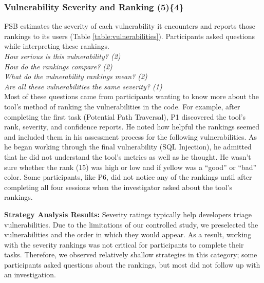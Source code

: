 \documentclass[10pt,journal,compsoc]{IEEEtran}
\begin{document}



\subsubsection{Vulnerability Severity and Ranking (5)\{4\}}

\label{bsr}

FSB estimates the severity of each vulnerability it encounters and reports those rankings to its users (Table \ref{table:vulnerabilities}). 
Participants asked questions while interpreting these rankings.
\\

\noindent\emph{How serious is this vulnerability? (2)} \\
\emph{How do the rankings compare? (2)} \\
\emph{What do the vulnerability rankings mean? (2)} \\
\emph{Are all these vulnerabilities the same severity? (1)}
\\
 
Most of these questions came from participants wanting to know more about the tool's method of ranking the vulnerabilities in the code.
For example, after completing the first task (Potential Path Traversal), P1 discovered the tool's rank, severity, and confidence reports. 
He noted how helpful the rankings seemed and included them in his assessment process for the following vulnerabilities.
As he began working through the final vulnerability (SQL Injection), he admitted that he did not understand the tool's metrics as well as he thought. 
He wasn't sure whether the rank (15) was high or low and if yellow was a ``good'' or ``bad'' color.
Some participants, like P6, did not notice any of the rankings until after completing all four sessions when the investigator asked about the tool's rankings.


\textbf{Strategy Analysis Results:}
Severity ratings typically help developers triage vulnerabilities.
Due to the limitations of our controlled study, we preselected the vulnerabilities and the order in which they would appear.
As a result, working with the severity rankings was not critical for participants to complete their tasks.
Therefore, we observed relatively shallow strategies in this category; some participants asked questions about the rankings, but most did not follow up with an investigation.
\end{document}
